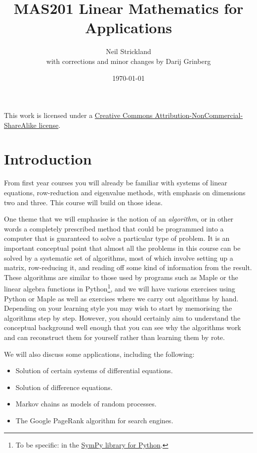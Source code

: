\documentclass[reqno]{amsart}
\theoremstyle{definition}
\begin{document}
\title{MAS201 Linear Mathematics for Applications}
\author{Neil Strickland \\ with corrections and minor changes by Darij Grinberg}
\date{\today}

\maketitle

\begin{center}
 This work is licensed under a 
 \href{https://creativecommons.org/licenses/by-nc-sa/3.0/deed.en}{%
  Creative Commons Attribution-NonCommercial-ShareAlike license}.
 
 \bigskip

 \doclicenseImage 
\end{center}

\tableofcontents 

\section{Introduction}
\label{sec-intro}

From first year courses you will already be familiar with systems of
linear equations, row-reduction and eigenvalue methods, with emphasis
on dimensions two and three.  This course will build on those ideas.  

One theme that we will emphasise is the notion of an \emph{algorithm},
or in other words a completely prescribed method that could be
programmed into a computer that is guaranteed to solve a particular
type of problem.  It is an important conceptual point that almost all
the problems in this course can be solved by a systematic set of
algorithms, most of which involve setting up a matrix, row-reducing
it, and reading off some kind of information from the result.  These
algorithms are similar to those used by programs such as Maple or the
linear algebra functions in Python\footnote{To be specific: in the
\href{http://sympy.org}{SymPy library for Python}.},
and we will have various exercises
using Python or Maple as well as exercises where we carry out
algorithms by hand.  Depending on your learning style you may wish to
start by memorising the algorithms step by step.  However, you should
certainly aim to understand the conceptual background well enough that
you can see why the algorithms work and can reconstruct them for
yourself rather than learning them by rote.

We will also discuss some applications, including the following:
\begin{itemize}
 \item Solution of certain systems of differential equations.
 \item Solution of difference equations.
 \item Markov chains as models of random processes.
 \item The Google PageRank algorithm for search engines.
\end{itemize}
\end{document}
